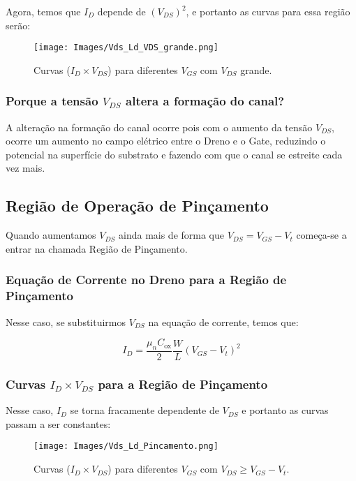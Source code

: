 \documentclass[12pt]{article}
\begin{document}
Agora, temos que $I_D$ depende de $(V_{DS})^2$, e portanto as curvas para essa região serão:

\begin{figure}[H]
  \begin{center}
    \texttt{[image: Images/Vds\_Ld\_VDS\_grande.png]}
  \end{center}
  \caption{Curvas ($I_D \times V_{DS}$) para diferentes $V_{GS}$ com $V_{DS}$ grande.}
\end{figure}

\subsubsection{Porque a tensão $V_{DS}$ altera a formação do canal?}

A alteração na formação do canal ocorre pois com o aumento da tensão $V_{DS}$, ocorre um aumento no campo elétrico entre o Dreno e o Gate, reduzindo o potencial na superfície do substrato e fazendo com que o canal se estreite cada vez mais.

\subsection{Região de Operação de Pinçamento}

Quando aumentamos $V_{DS}$ ainda mais de forma que $V_{DS}=V_{GS}-V_t$ começa-se a entrar na chamada Região de Pinçamento. 

\subsubsection{Equação de Corrente no Dreno para a Região de Pinçamento}

Nesse caso, se substituirmos $V_{DS}$ na equação de corrente, temos que:

$$
  I_D = \frac{\mu_n C_{\text{ox}}}{2} \frac{W}{L} (V_{GS} - V_t)^2 
$$

\subsubsection{Curvas $I_D \times V_{DS}$ para a Região de Pinçamento}

Nesse caso, $I_D$ se torna fracamente dependente de $V_{DS}$ e portanto as curvas passam a ser constantes:

\begin{figure}[H]
  \begin{center}
    \texttt{[image: Images/Vds\_Ld\_Pincamento.png]}
  \end{center}
  \caption{Curvas ($I_D \times V_{DS}$) para diferentes $V_{GS}$ com $V_{DS} \geq V_{GS} - V_t$.}
  \label{fig:chart_pincamento}
\end{figure}
\end{document}

